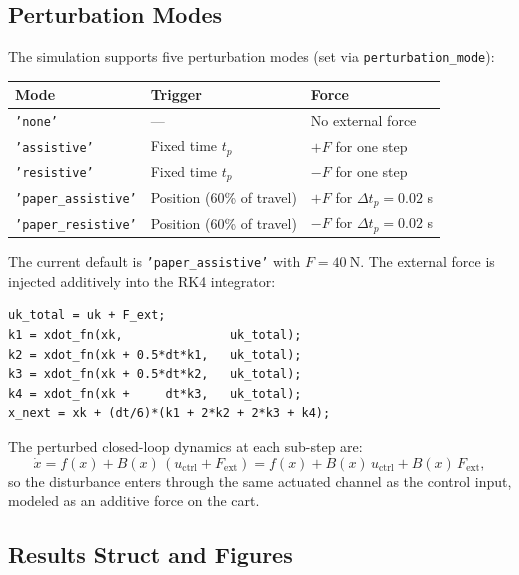 \documentclass[11pt,a4paper]{article}
\begin{document}
\subsection{Perturbation Modes}

The simulation supports five perturbation modes (set via \texttt{perturbation\_mode}):

\begin{center}
\begin{tabular}{lll}
\toprule
\textbf{Mode} & \textbf{Trigger} & \textbf{Force} \\
\midrule
\texttt{'none'}             & ---           & No external force \\
\texttt{'assistive'}        & Fixed time \(t_p\) & \(+F\) for one step \\
\texttt{'resistive'}        & Fixed time \(t_p\) & \(-F\) for one step \\
\texttt{'paper\_assistive'} & Position (60\% of travel) & \(+F\) for \(\Delta t_p = 0.02\) s \\
\texttt{'paper\_resistive'} & Position (60\% of travel) & \(-F\) for \(\Delta t_p = 0.02\) s \\
\bottomrule
\end{tabular}
\end{center}

The current default is \texttt{'paper\_assistive'} with \(F = 40~\text{N}\). The external force is injected additively into the RK4 integrator:

\begin{lstlisting}
uk_total = uk + F_ext;
k1 = xdot_fn(xk,               uk_total);
k2 = xdot_fn(xk + 0.5*dt*k1,   uk_total);
k3 = xdot_fn(xk + 0.5*dt*k2,   uk_total);
k4 = xdot_fn(xk +     dt*k3,   uk_total);
x_next = xk + (dt/6)*(k1 + 2*k2 + 2*k3 + k4);
\end{lstlisting}

\begin{codemath}
The perturbed closed-loop dynamics at each sub-step are:
\[
\dot x = f(x) + B(x)\,(u_{\mathrm{ctrl}} + F_{\mathrm{ext}})
       = f(x) + B(x)\,u_{\mathrm{ctrl}} + B(x)\,F_{\mathrm{ext}},
\]
so the disturbance enters through the same actuated channel as the control input, modeled as an additive force on the cart.
\end{codemath}

\subsection{Results Struct and Figures}
\end{document}
